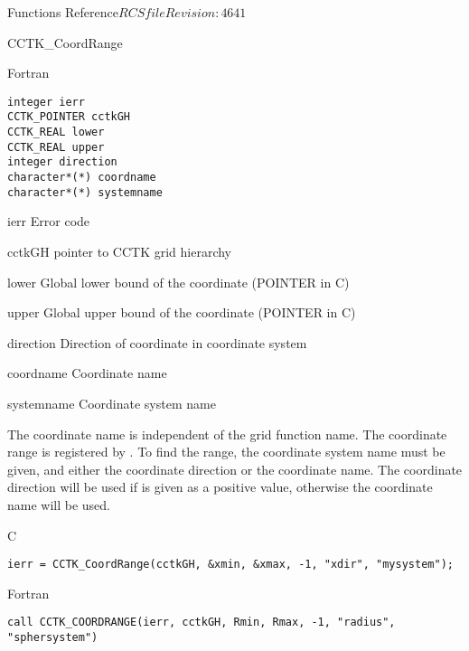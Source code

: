 \begin{cactuspart}{ Functions Reference}{$RCSfile$}{$Revision: 4641 $}
\begin{FunctionDescription}{CCTK\_CoordRange}
\begin{SynopsisSection}
\begin{Synopsis}{Fortran}
\begin{verbatim}
integer ierr
CCTK_POINTER cctkGH
CCTK_REAL lower
CCTK_REAL upper
integer direction
character*(*) coordname
character*(*) systemname \end{verbatim}
\end{Synopsis}
\end{SynopsisSection}
\begin{ParameterSection}
\begin{Parameter}{ierr}
Error code
\end{Parameter}
\begin{Parameter}{cctkGH}
pointer to CCTK grid hierarchy
\end{Parameter}
\begin{Parameter}{lower}
Global lower bound of the coordinate (POINTER in C)
\end{Parameter}
\begin{Parameter}{upper}
Global upper bound of the coordinate (POINTER in C)
\end{Parameter}
\begin{Parameter}{direction}
Direction of coordinate in coordinate system
\end{Parameter}
\begin{Parameter}{coordname}
Coordinate name
\end{Parameter}
\begin{Parameter}{systemname}
Coordinate system name
\end{Parameter}
\end{ParameterSection}
\begin{Discussion}
The coordinate name is independent of the grid function name.
The coordinate range is registered by .
To find the range, the coordinate system name must be given, and either
the coordinate direction or the coordinate name. The coordinate direction
will be used if is given as a positive value, otherwise the coordinate
name will be used.
\end{Discussion}
\begin{ExampleSection}
\begin{Example}{C}
\begin{verbatim}
ierr = CCTK_CoordRange(cctkGH, &xmin, &xmax, -1, "xdir", "mysystem");
\end{verbatim}
\end{Example}
\begin{Example}{Fortran}
\begin{verbatim}
call CCTK_COORDRANGE(ierr, cctkGH, Rmin, Rmax, -1, "radius", "sphersystem")
\end{verbatim}
\end{Example}
\end{ExampleSection}
\end{FunctionDescription}


\end{cactuspart}
